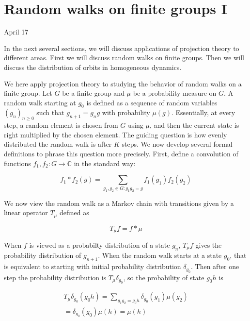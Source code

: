 \documentclass[12pt]{amsart}
\begin{document}
\newpage


\section{Random walks on finite groups I}
 
 April 17
 
 In the next several sections,  we will discuss applications of projection theory to different areas.   First we will discuss random walks on finite groups.   Then we will discuss the distribution of orbits in homogeneous dynamics.  

We here apply projection theory to studying the behavior of random walks on a finite group. Let $G$ be a finite group and $\mu$ be a probability measure on $G$. A random walk starting at $g_0$ is defined as a sequence of random variables $(g_n)_{n\geq 0}$ such that $g_{n+1} = g_n g$ with probability $\mu(g)$. Essentially, at every step, a random element is chosen from $G$ using $\mu$, and then the current state is right multiplied by the chosen element. The guiding question is how evenly distributed the random walk is after $K$ steps. We now develop several formal definitions to phrase this question more precisely. First, define a convolution of functions $f_1, f_2: G \to \mathbb{C}$ in the standard way: 

\begin{equation}
f_1 * f_2(g) = \sum_{g_1, g_2 \in G: g_1g_2 = g} f_1(g_1)f_2(g_2)
\end{equation} 

We now view the random walk as a Markov chain with transitions given by a linear operator $T_\mu$ defined as 


\begin{equation}
T_\mu f = f * \mu 
\end{equation}

When $f$ is viewed as a probabilty distribution of a state $g_n$, $T_\mu f$ gives the probability distribution of $g_{n+1}$. When the random walk starts at a state $g_0$, that is equivalent to starting with initial probability distribution $\delta_{g_0}$. Then after one step the probability distribution is $T_\mu \delta_{g_0}$, so the probability of state $g_0 h$ is 

\begin{align}
    T_\mu \delta_{g_0} (g_0 h)  = \sum_{g_1 g_2 = g_0 h} \delta_{g_0}(g_1) \mu(g_2)\\
    = \delta_{g_0}(g_0) \mu(h) = \mu(h)
\end{align} 
\end{document}
